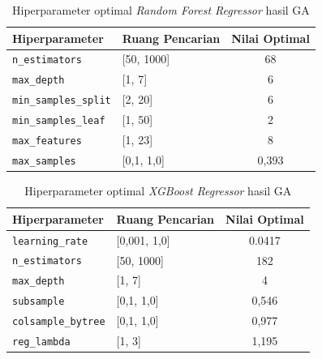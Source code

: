 \begin{table}[H]
\centering
\caption{Hiperparameter optimal \textit{Random Forest Regressor} hasil GA}
\label{tab:optimal_hp_rf}
\begin{tabular}{llc}
\toprule
\textbf{Hiperparameter} & \textbf{Ruang Pencarian} & \textbf{Nilai Optimal} \\
\midrule
\texttt{n\_estimators}       & [50, 1000]    & 68   \\
\texttt{max\_depth}          & [1, 7]         & 6     \\
\texttt{min\_samples\_split} & [2, 20]        & 6     \\
\texttt{min\_samples\_leaf}  & [1, 50]        & 2     \\
\texttt{max\_features}       & [1, 23]     & 8     \\
\texttt{max\_samples}        & [0{,}1, 1{,}0] & 0{,}393 \\
\bottomrule
\end{tabular}
\end{table}

\begin{table}[H]
\centering
\caption{Hiperparameter optimal \textit{XGBoost Regressor} hasil GA}
\label{tab:optimal_hp_xgb}
\begin{tabular}{llc}
\toprule
\textbf{Hiperparameter} & \textbf{Ruang Pencarian} & \textbf{Nilai Optimal} \\
\midrule
\texttt{learning\_rate}      & [0{,}001, 1{,}0]     & 0{.}0417 \\
\texttt{n\_estimators}       & [50, 1000]           & 182   \\
\texttt{max\_depth}          & [1, 7]                & 4     \\
\texttt{subsample}           & [0{,}1, 1{,}0]       & 0{,}546 \\
\texttt{colsample\_bytree}   & [0{,}1, 1{,}0]       & 0{,}977 \\
\texttt{reg\_lambda}         & [1, 3]                & 1{,}195 \\
\bottomrule
\end{tabular}
\end{table}



